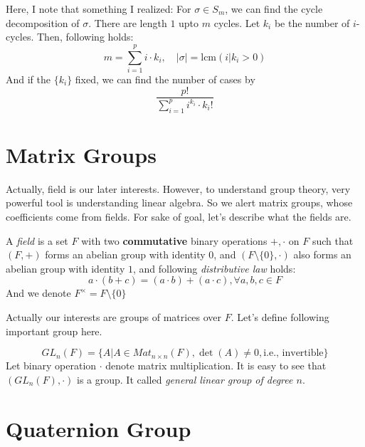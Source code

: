 \documentclass[12pt, a4paper, openany, twoside]{book}
\theoremstyle{definition}
\theoremstyle{remark}
\theoremstyle{plain}
\numberwithin{equation}{section}
\begin{document}
Here, I note that something I realized: 
For $\sigma \in S_m$, we can find the cycle decomposition of $\sigma$. 
There are length $1$ upto $m$ cycles. Let $k_i$ be the number of $i$-cycles. 
Then, following holds: 
\[m = \sum_{i=1}^{p} i \cdot k_i, \quad |\sigma| = \text{lcm}(i | k_i > 0)\]
And if the $\{k_i\}$ fixed, we can find the number of cases by 
\[\frac{p!}{\sum_{i = 1}^{p}i^{k_i} \cdot k_i!}\]

\newpage 

\section{Matrix Groups}

Actually, field is our later interests. However, to understand group theory, very powerful tool is understanding linear algebra. 
So we alert matrix groups, whose coefficients come from fields. For sake of goal, let's describe what the fields are. 

\begin{tcolorbox}[colback=yellow!10!white,colframe=brown!75!black,title=Fields]

A \textit{field} is a set $F$ with two \textbf{commutative} binary operations $+, \cdot$ on $F$ such that 
$(F, +)$ forms an abelian group with identity $0$, and $(F\setminus \{0\}, \cdot)$ also forms an abelian group with identity $1$, 
and following \textit{distributive law} holds: 
\[a \cdot (b + c) = (a \cdot b) + (a \cdot c), \forall a,b,c \in F\]
And we denote $F^{\times} = F \setminus \{0\}$ 

\end{tcolorbox}

Actually our interests are groups of matrices over $F$. Let's define following important group here. 

\begin{tcolorbox}[colback=yellow!10!white,colframe=brown!75!black,title=Matrix groups($GL_n(F)$)]

\[GL_n(F) = \{A | A \in Mat_{n\times n}(F), \det(A) \neq 0, \text{i.e., invertible}\}\]
Let binary operation $\cdot$ denote matrix multiplication. It is easy to see that $(GL_n(F), \cdot)$ is a group. 
It called \textit{general linear group of degree $n$}.  

\end{tcolorbox}

\newpage 

\section{Quaternion Group}
\end{document}

